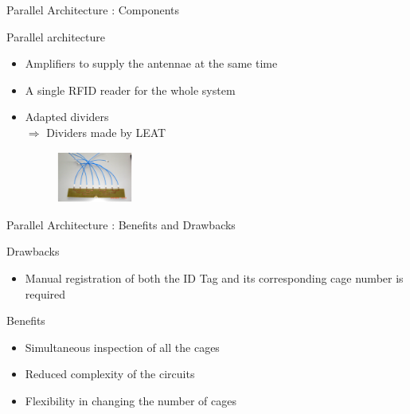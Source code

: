 \documentclass[utf8,compress]{beamer}
\begin{document}
\begin{frame}[containsverbatim]{Parallel Architecture : Components}
\begin{block}{Parallel architecture}
\begin{itemize}
    \item Amplifiers to supply the antennae at the same time
\vspace{0.8em} 
    \item  A single RFID reader for the whole system
\vspace{0.8em} 
    \item   Adapted dividers\\
\vspace{0.8em} 
          $\Rightarrow$ Dividers made by LEAT
		\begin{figure}[h]
     			   \includegraphics[width=2.5cm]{divisors.png}
   		 \end{figure}

\end{itemize}
\end{block}
\end{frame}



\begin{frame}{Parallel Architecture : Benefits and Drawbacks}


\begin{alertblock}{Drawbacks}
\begin{itemize}
    \item  Manual registration of both the ID Tag and its corresponding cage number is required
\end{itemize}
\end{alertblock}


\begin{exampleblock}{Benefits}
\begin{itemize}
    \item Simultaneous inspection of all the cages
   \item Reduced complexity of the circuits
   \item Flexibility in changing the number of cages
\end{itemize}
\end{exampleblock}
\end{frame}
\end{document}
